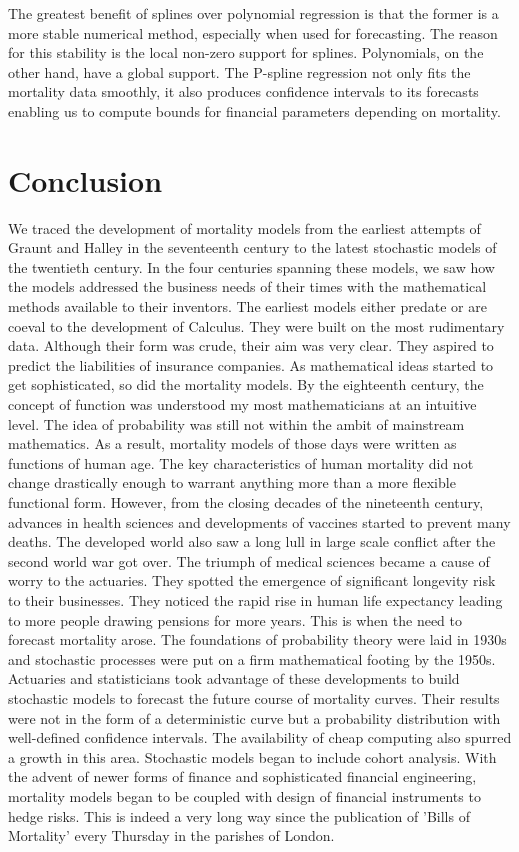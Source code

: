 \documentclass{article}
\numberwithin{equation}{section}
\begin{document}
The greatest benefit of splines over polynomial regression is that the former is
a more stable numerical method, especially when used for forecasting. The
reason for this stability is the local non-zero support for splines. 
Polynomials, on the other hand, have a global support. The P-spline regression
not only fits the mortality data smoothly, it also produces confidence intervals
to its forecasts enabling us to compute bounds for financial parameters 
depending on mortality.

\section{Conclusion}
We traced the development of mortality models from the earliest attempts of
Graunt and Halley in the seventeenth century to the latest stochastic models
of the twentieth century. In the four centuries spanning these models, we
saw how the models addressed the business needs of their times with the
mathematical methods available to their inventors. The earliest models either
predate or are coeval to the development of Calculus. They were built on the
most rudimentary data. Although their form was crude, their aim was very clear.
They aspired to predict the liabilities of insurance companies. As mathematical
ideas started to get sophisticated, so did the mortality models. By the
eighteenth century, the concept of function was understood my most 
mathematicians at an intuitive level. The idea of probability was still not
within the ambit of mainstream mathematics. As a result, mortality models of
those days were written as functions of human age. The key characteristics
of human mortality did not change drastically enough to warrant anything more
than a more flexible functional form. However, from the closing decades of the
nineteenth century, advances in health sciences and developments of vaccines 
started to prevent many deaths. The developed world also saw a long lull in 
large scale conflict after the second world war got over. The triumph of
medical sciences became a cause of worry to the actuaries. They spotted the
emergence of significant longevity risk to their businesses. They noticed the
rapid rise in human life expectancy leading to more people drawing pensions
for more years. This is when the need to forecast mortality arose. The 
foundations of probability theory were laid in 1930s and stochastic processes
were put on a firm mathematical footing by the 1950s. Actuaries and 
statisticians took advantage of these developments to build stochastic models
to forecast the future course of mortality curves. Their results were not
in the form of a deterministic curve but a probability distribution with
well-defined confidence intervals. The availability of cheap computing also
spurred a growth in this area. Stochastic models began to include cohort 
analysis. With the advent of newer forms of finance and sophisticated
financial engineering, mortality models began to be coupled with design of
financial instruments to hedge risks. This is indeed a very long way since the
publication of 'Bills of Mortality' every Thursday in the parishes of London.


\end{document}

